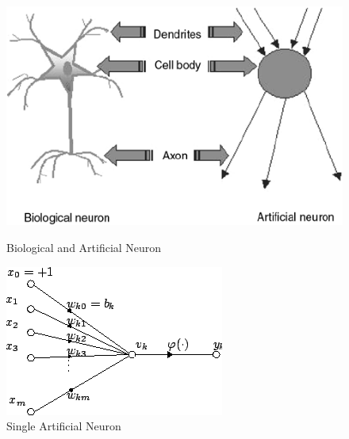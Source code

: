 \begin{figure}[H]
	\centering
	\includegraphics[width=\linewidth]{images/Fig-1-Analogy-between-artificial-neuron-and-biological-neuron.png}
	\caption{Biological and Artificial Neuron}
	\label{fig:artifical_and_biological}
	\endminipage\hfill
	\includegraphics[width=\linewidth]{images/artificial_neuron.png}
	\caption{Single Artificial Neuron}
	\label{fig:artificial_neuron}
	\endminipage
\end{figure}


